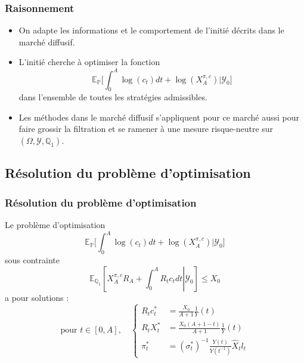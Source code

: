 \documentclass{beamer}
\begin{document}
\begin{frame}
\frametitle{Raisonnement}
\begin{itemize}
\item On adapte les informations et le comportement de l'initié décrits dans le marché diffusif. 
\item L'initié cherche à optimiser la fonction 
\begin{equation*}
\mathbb{E}_{\mathbb{P}} \Big[ \displaystyle \int_{0}^{A} \log (c_t)dt + \log(X_A^{\pi, c})\Big |\mathcal{Y}_0\Big]
\end{equation*}
dans l'ensemble de toutes les stratégies admissibles.
\item Les méthodes dans le marché diffusif s'appliquent pour ce marché aussi pour faire grossir la filtration et se ramener à une mesure risque-neutre sur $(\Omega, \mathcal{Y}, \mathbb{Q}_1)$.
\end{itemize}
\end{frame}

\subsection{Résolution du problème d'optimisation}
\begin{frame}
\frametitle{Résolution du problème d'optimisation}
Le problème d'optimisation 
\begin{equation*}
\mathbb{E}_{\mathbb{P}} \Big[ \displaystyle \int_{0}^{A} \log (c_t)dt + \log(X_A^{\pi, c})\Big |\mathcal{Y}_0\Big]
\end{equation*}
sous contrainte 
\begin{equation*}
\mathbb{E}_{\mathbb{Q}_1} \left[ X_A^{\pi, c} R_A + \int_0^A R_t c_t dt \left\vert\right. \mathcal{Y}_0 \right] \leq X_0
\end{equation*}
a pour solutions : 
\begin{displaymath}
\text{pour } t \in [0, A], \quad \begin{cases}
 R_t {c}_t^* &= \frac{X_0}{A+1} \frac{1}{Y}(t)\\
 R_t {X}_t^* &= \frac{X_0(A+1-t)}{A+1}\frac{1}{Y}(t)\\
 {\pi}_t^* &= (\sigma^*_t)^{-1}\frac{Y(t)}{Y(t^{-1})}\widehat{X}_t l_t
\end{cases}
\end{displaymath}
\end{frame}
\end{document}
